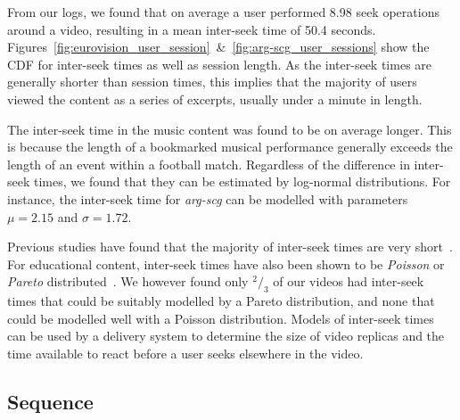 \documentclass[a4paper,11pt]{article}
\begin{document}
From our logs, we found that on average a user performed 8.98 seek operations around a video, resulting in a mean inter-seek time of 50.4 seconds. Figures~\ref{fig:eurovision_user_session}~\&~\ref{fig:arg-scg_user_sessions} show the CDF for inter-seek times as well as session length. As the inter-seek times are generally shorter than session times, this implies that the majority of users viewed the content as a series of excerpts, usually under a minute in length.





The inter-seek time in the music content was found to be on average longer. This is because the length of a bookmarked musical performance generally exceeds the length of an event within a football match. Regardless of the difference in inter-seek times, we found that they can be estimated by log-normal distributions. For instance, the inter-seek time for \emph{arg-scg} can be modelled with parameters $\mu=2.15$ and $\sigma=1.72$.

Previous studies have found that the majority of inter-seek times are very short~\cite{vilas2005user}. For educational content, inter-seek times have also been shown to be \emph{Poisson} or \emph{Pareto} distributed~\cite{Almeida01Analysis}. We however found only $^2/_3$ of our videos had inter-seek times that could be suitably modelled by a Pareto distribution, and none that could be modelled well with a Poisson distribution. Models of inter-seek times can be used by a delivery system to determine the size of video replicas and the time available to react before a user seeks elsewhere in the video.

\subsection{Sequence}
\label{sect:sequence}
\end{document}
